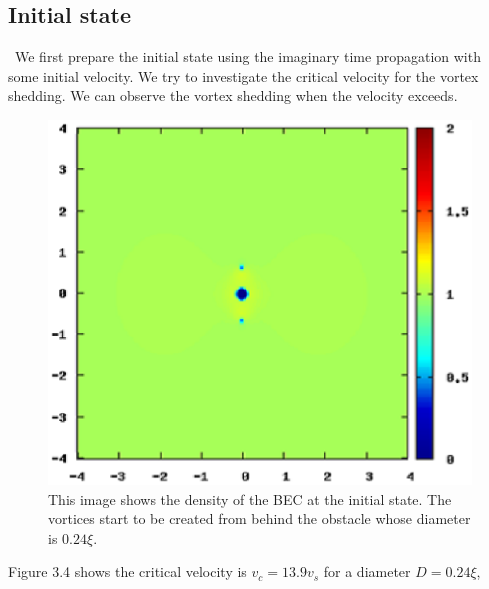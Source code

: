 \documentclass[12pt,a4paper]{report}
\begin{document}
\subsection{Initial state}
\ We first prepare the initial state using the imaginary time propagation with some initial velocity.
We try to investigate the critical velocity for the vortex shedding.
We can observe the vortex shedding when the velocity exceeds.
\begin{figure}[htbp]\begin{center}
\includegraphics[scale=0.6,keepaspectratio]{3-4.eps}
\caption{
This image shows the density of the BEC at the initial state.
The vortices start to be created from behind the obstacle whose diameter is $0.24\xi$.
}
\label{FIG:3-4}
\end{center}\end{figure}
Figure 3.4 shows the critical velocity is $v_c = 13.9v_s$ for a diameter $D = 0.24\xi$,
\end{document}
